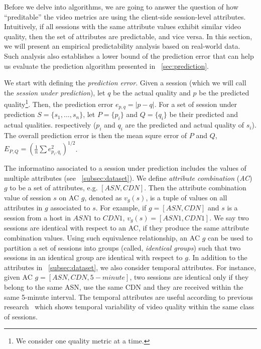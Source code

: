 Before we delve into algorithms, we are going to answer the question of how ``preditable'' the video metrics are using the client-side session-level attributes. Intuitively, if all sessions with the same attribute values exhibit similar video quality, then the set of attributes are predictable, and vice versa. In this section, we will present an empirical predictability analysis based on real-world data. Such analysis also establishes a lower bound of the prediction error that can help us evaluate the prediction algorithm presented in \Section~\ref{sec:prediction}.

\label{subsec:definitions}



 We start with defining the {\it prediction error}.  Given a session
(which we will call the {\it session under prediction}), let $q$ be
the actual quality and $p$ be the predicted quality\footnote{We consider one quality metric at a time.}. Then, the
prediction error $e_{p,q}=|p-q|$.
For a set of session under prediction $S=\{s_1,\dots,s_n\}$, let $P=\{p_i\}$ and $Q=\{q_i\}$ be their predicted and actual qualities. respectively ($p_i$ and $q_i$ are the predicted and actual quality of $s_i$). The overall prediction error is then the mean squre error of $P$ and $Q$, $E_{P,Q}=\left(\frac{1}{n}\sum e_{p_i,q_i}^2\right)^{1/2}$.

 The informatino associated to a session under prediction includes the values of multiple attributes (see \Section~\ref{subsec:dataset}). We define {\it attribute combination} ({\it AC}) $g$ to be a set of attributes, e.g. $[ASN, CDN]$. Then the attribute combination value of session $s$ on AC $g$, denoted as $v_g(s)$, is a tuple of values on all attributes in $g$ associated to $s$. For example, if $g=[ASN,CDN]$ and $s$ is a session from a host in $ASN1$ to $CDN1$, $v_g(s)=[ASN1, CDN1]$. We say two sessions are identical with respect to an AC, if they produce the same attribute combination values. Using such equivalence relationship, an AC $g$ can be used to partition a set of sessions into groups (called, {\it identical groups}) such that two sessions in an identical group are identical with respect to $g$.
In addition to the attributes in \Section~\ref{subsec:dataset}, we also consider temporal attributes. For instance, given AC $g=[ASN, CDN, 5-minute]$, two sessions are identical only if they belong to the same ASN, use the same CDN and they are received within the same 5-minute interval. The temporal attributes are useful according to previous research~\cite{sigcomm2012} which shows temporal variability of video quality within the same class of sessions.




